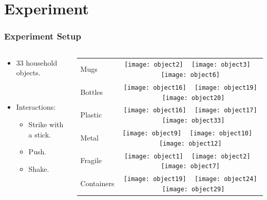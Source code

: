 \documentclass[t]{beamer}
\begin{document}
\section{Experiment}
\begin{frame}
  \frametitle{Experiment Setup}

  \begin{columns}
    \begin{column}{.4\linewidth}
      \begin{itemize}
        \item 33 household objects.

          ~

        \item Interactions:
          \begin{itemize}
            \item Strike with a stick.
            \item Push.
            \item Shake.
          \end{itemize}
      \end{itemize}
    \end{column}
    \begin{column}{.55\linewidth}
      \begin{tabular}[t]{lc}
        \hline
        Mugs & \texttt{[image: object2]} ~ \texttt{[image: object3]} ~ \texttt{[image: object6]} \\
        Bottles & \texttt{[image: object16]} ~ \texttt{[image: object19]} ~ \texttt{[image: object20]} \\
        Plastic & \texttt{[image: object16]} ~ \texttt{[image: object17]} ~ \texttt{[image: object33]} \\
        Metal & \texttt{[image: object9]} ~ \texttt{[image: object10]} ~ \texttt{[image: object12]} \\
        Fragile & \texttt{[image: object1]} ~ \texttt{[image: object2]} ~ \texttt{[image: object7]} \\
        Containers & \texttt{[image: object19]} ~ \texttt{[image: object24]} ~ \texttt{[image: object29]} \\
        \hline
      \end{tabular}
    \end{column}
  \end{columns}
\end{frame}
\end{document}
